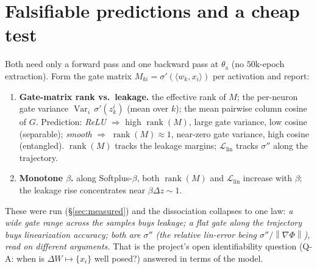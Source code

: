 \documentclass[11pt]{article}
\newcommand{\dW}{\Delta W}
\newcommand{\norm}[1]{\left\lVert #1 \right\rVert}
\newcommand{\ip}[2]{\langle #1, #2\rangle}
\newcommand{\rank}{\operatorname{rank}}
\newcommand{\Var}{\operatorname{Var}}
\begin{document}
\section{Falsifiable predictions and a cheap test}\label{sec:test}
Both need only a forward pass and one backward pass at $\theta_{\mathrm a}$ (no $50$k-epoch extraction).
Form the gate matrix $M_{ki}=\sigma'(\ip{w_k}{x_i})$ per activation and report:
\begin{enumerate}
  \item \textbf{Gate-matrix rank vs.\ leakage.} the effective rank of $M$; the per-neuron gate variance
  $\Var_i\,\sigma'(z_k^i)$ (mean over $k$); the mean pairwise column cosine of $G$. Prediction:
  \emph{ReLU} $\Rightarrow$ high $\rank(M)$, large gate variance, low cosine (separable); \emph{smooth}
  $\Rightarrow$ $\rank(M)\approx1$, near-zero gate variance, high cosine (entangled). $\rank(M)$ tracks
  the leakage margins; $\mathcal L_{\mathrm{lin}}$ tracks $\sigma''$ along the trajectory.
  \item \textbf{Monotone $\beta$.} along Softplus-$\beta$, both $\rank(M)$ and $\mathcal L_{\mathrm{lin}}$
  increase with $\beta$; the leakage rise concentrates near $\beta\Delta z\sim1$.
\end{enumerate}
These were run (\S\ref{sec:measured}) and the dissociation collapses to one law: \emph{a wide gate range
across the samples buys leakage; a flat gate along the trajectory buys linearization accuracy; both are
$\sigma''$ (the relative lin-error being $\sigma''/\norm{\nabla\Phi}$), read on different arguments.} That
is the project's open identifiability question (Q-A: when is $\dW\mapsto\{x_i\}$ well posed?) answered in
terms of the model.
\end{document}
